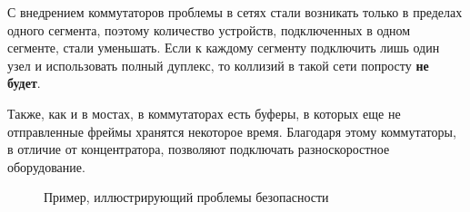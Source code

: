 С внедрением коммутаторов проблемы в сетях стали возникать только в пределах одного сегмента, поэтому количество устройств, подключенных в одном сегменте, стали уменьшать. Если к каждому сегменту подключить лишь один узел и использовать полный дуплекс, то коллизий в такой сети попросту \textbf{не будет}.

Также, как и в мостах, в коммутаторах есть буферы, в которых еще не отправленные фреймы хранятся некоторое время. Благодаря этому коммутаторы, в отличие от концентратора, позволяют подключать разноскоростное оборудование.

\begin{figure}[h!]
	\centering
	\begin{minipage}[h]{0.45\linewidth}
	\end{minipage}
	\hfill
	\begin{minipage}[h]{0.45\linewidth}
	\end{minipage}
	\hfill
	\vfill
	\caption{Пример, иллюстрирующий проблемы безопасности}
	\label{fig:switch_security}
\end{figure}
